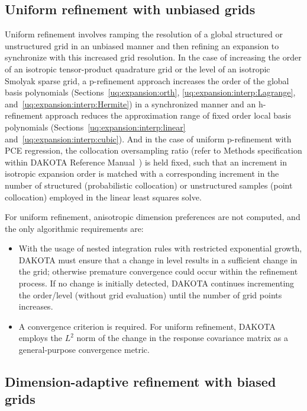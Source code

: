 \subsection{Uniform refinement with unbiased grids}
\label{uq:expansion:refine:uniform}

Uniform refinement involves ramping the resolution of a global
structured or unstructured grid in an unbiased manner and then
refining an expansion to synchronize with this increased grid
resolution.  In the case of increasing the order of an isotropic
tensor-product quadrature grid or the level of an isotropic Smolyak
sparse grid, a p-refinement approach increases the order of the global
basis polynomials (Sections~\ref{uq:expansion:orth},
\ref{uq:expansion:interp:Lagrange},
and~\ref{uq:expansion:interp:Hermite}) in a synchronized manner and an
h-refinement approach reduces the approximation range of fixed order
local basis polynomials (Sections~\ref{uq:expansion:interp:linear}
and~\ref{uq:expansion:interp:cubic}).  And in the case of uniform
p-refinement with PCE regression, the collocation oversampling ratio
(refer to Methods specification within DAKOTA Reference
Manual~\cite{RefMan}) is held fixed, such that an increment in
isotropic expansion order is matched with a corresponding increment in
the number of structured (probabilistic collocation) or unstructured
samples (point collocation) employed in the linear least squares solve.
 
For uniform refinement, anisotropic dimension preferences are not
computed, and the only algorithmic requirements are:
\begin{itemize}
\item With the usage of nested integration rules with restricted
  exponential growth, DAKOTA must ensure that a change in level
  results in a sufficient change in the grid; otherwise premature
  convergence could occur within the refinement process.  If no change
  is initially detected, DAKOTA continues incrementing the order/level
  (without grid evaluation) until the number of grid points increases.
\item A convergence criterion is required.  For uniform refinement,
  DAKOTA employs the $L^2$ norm of the change in the response
  covariance matrix as a general-purpose convergence metric.
\end{itemize}


\subsection{Dimension-adaptive refinement with biased grids}

